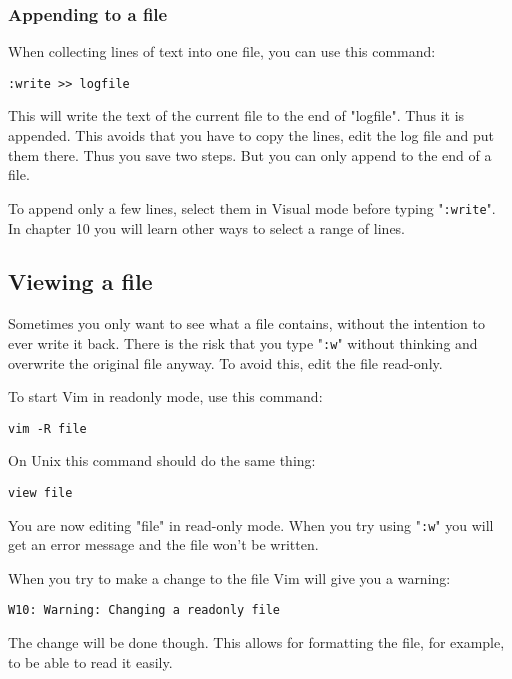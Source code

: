 \subsubsection{Appending to a file}
When collecting lines of text into one file, you can use this command:

 \begin{Verbatim}[samepage=true]
 :write >> logfile
 \end{Verbatim}

This will write the text of the current file to the end of "logfile".
Thus it is appended.
This avoids that you have to copy the lines, edit the log file and put them there.
Thus you save two steps.
But you can only append to the end of a file.

To append only a few lines, select them in Visual mode before typing "\verb!:write!".
In chapter 10 you will learn other ways to select a range of lines.

\subsection{Viewing a file}
Sometimes you only want to see what a file contains, without the intention to ever write it back.
There is the risk that you type "\verb!:w!" without thinking and overwrite the original file anyway.
To avoid this, edit the file read-only.

To start Vim in readonly mode, use this command:

 \begin{Verbatim}[samepage=true]
 vim -R file
 \end{Verbatim}

On Unix this command should do the same thing:

 \begin{Verbatim}[samepage=true]
 view file
 \end{Verbatim}

You are now editing "file" in read-only mode.
When you try using "\verb!:w!" you will get an error message and the file won't be written.

When you try to make a change to the file Vim will give you a warning:

\begin{Verbatim}[samepage=true]
    W10: Warning: Changing a readonly file 
\end{Verbatim}

The change will be done though.
This allows for formatting the file, for example, to be able to read it easily.


